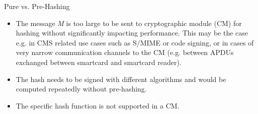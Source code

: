 \begin{minipage}[t]{0.28\textwidth}
\begin{algorithmbox}{Pure vs. Pre-Hashing}
\begin{itemize}[leftmargin=*]
            \begin{itemize}[leftmargin=*]
                \setlength\itemsep{0em}
                \item The message {\itshape M} is too large to be sent to cryptographic module (CM) for hashing without significantly impacting performance. This may be the case e.g. in CMS related use cases such as S/MIME or code signing, or in cases of very narrow communication channels to the CM (e.g. between APDUs exchanged between smartcard and smartcard reader).
                \item The hash needs to be signed with different algorithms and would be computed repeatedly without pre-hashing.
                \item The specific hash function is not supported in a CM.
            \end{itemize}
            \vspace{3mm}
        \end{itemize}
    \end{algorithmbox}
\end{minipage}


